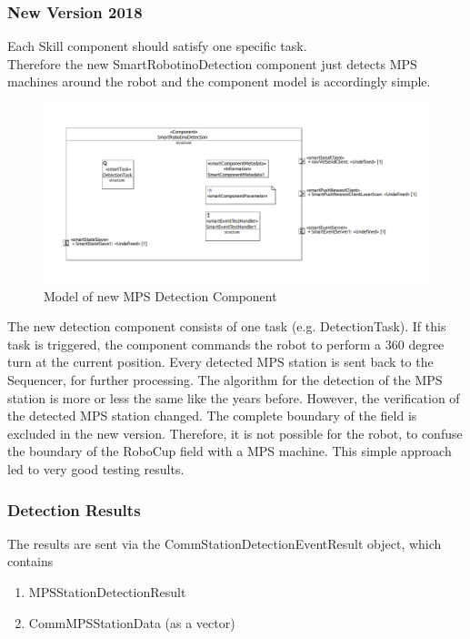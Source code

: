 \subsubsection{ New Version 2018}

Each Skill component should satisfy one specific task.\\
Therefore the new SmartRobotinoDetection component just detects MPS machines around the robot and the component model is accordingly simple.

\begin{figure}[h]
\centering
\includegraphics[scale=0.65]{pic/detectionComponent.png}
\caption{Model of new MPS Detection Component}
\label{fig:dockingNew_overview}
\end{figure}

The new detection component consists of one task (e.g. DetectionTask). If this task is triggered, the component commands the robot to perform a 360 degree turn at the current position. Every detected MPS station is sent back to the Sequencer, for further processing. 
The algorithm for the detection of the MPS station is more or less the same like the years before. However, the verification of the detected MPS station changed. The complete boundary of the field is excluded in the new version. Therefore, it is not possible for the robot, to confuse the boundary of the RoboCup field with a MPS machine. This simple approach led to very good testing results. 

\subsubsection{Detection Results}
The results are sent via the CommStationDetectionEventResult object, which contains 

\begin{enumerate}
\item MPSStationDetectionResult
\item CommMPSStationData (as a vector)
\end{enumerate}

